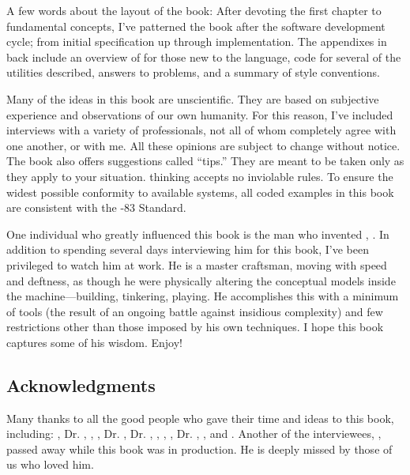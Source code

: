 A few words about the layout of the book: After devoting the first
chapter to fundamental concepts, I've patterned the book after the
software development cycle; from initial specification up through
implementation. The appendixes in back include an overview of \Forth{}
for those new to the language, code for several of the utilities described,
answers to problems, and a summary of style conventions.

Many of the ideas in this book are unscientific. They are based on
subjective experience and observations of our own humanity. For this
reason, I've included interviews with a variety of \Forth{}
professionals, not all of whom completely agree with one another, or
with me. All these opinions are subject to change without notice. The
book also offers suggestions called ``tips.'' They are meant to be
taken only as they apply to your situation. \Forth{} thinking accepts
no inviolable rules.  To ensure the widest possible conformity to
available \Forth{} systems, all coded examples in this book are
consistent with the \Forth{}-83 Standard.

One individual who greatly influenced this book is the man who
invented \Forth{}, . In addition to spending
several days interviewing him for this book, I've been privileged to
watch him at work. He is a master craftsman, moving with speed and
deftness, as though he were physically altering the conceptual models
inside the machine---building, tinkering, playing. He accomplishes
this with a minimum of tools (the result of an ongoing battle against
insidious complexity) and few restrictions other than those imposed by
his own techniques. I hope this book captures some of his
wisdom. Enjoy!


\subsection{Acknowledgments}

Many thanks to all the good people who gave their time and ideas to
this book, including: , Dr. , , ,
Dr. , Dr. , , , ,
Dr. , , and . Another of the interviewees, , passed
away while this book was in production. He is deeply missed by those
of us who loved him.

